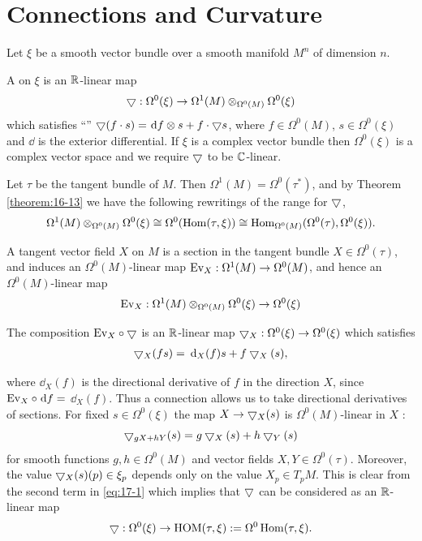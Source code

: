 \chapter{Connections and Curvature}
Let $\xi$ be a smooth vector bundle over a smooth manifold $M^n$ of dimension $n$.

\begin{definition}\label{definition:17-1}
A  on $\xi$ is an ${\mathbb{R}}$-linear map
\[
  \bigtriangledown:\Omega^0(\xi)\rightarrow \Omega^1(M)\otimes_{\Omega^0(M)} \Omega^0(\xi)
\]
which satisfies ``'' $\btd (f\cdot s)=\dd f\otimes  s + f\cdot \btd s$, 
where $f \in \Omega^0(M)$, $s\in \Omega^0(\xi)$ and $\dd$ is the exterior differential. 
If $\xi$ is a complex vector bundle then $\Omega^0(\xi)$ is a complex vector space and 
we require $\bigtriangledown$ to be ${\mathbb{C}}$-linear.
\end{definition}

Let $\tau$ be the tangent bundle of $M$. Then $\Omega^1(M)  = \Omega^0( {\tau }^{ * })$, 
and by Theorem \ref{theorem:16-13} we have the following rewritings of the range 
for $\bigtriangledown$,
\begin{align}\label{eq:17-1}
\Omega^1(M) \otimes_{\Omega^0(M) }\Omega^0(\xi)  
  \cong  \Omega^0( {\operatorname{Hom}( {\tau,\xi }) })  
  \cong  {\operatorname{Hom}}_{\Omega^0(M) }( {\Omega^0( \tau ),\Omega^0(\xi) }).
\end{align}

A tangent vector field $X$ on $M$ is a section in the tangent bundle $X \in  \Omega^0( \tau )$, 
and induces an $\Omega^0(M)$-linear map $\mathrm{Ev}_X:\Omega^1(M) \rightarrow \Omega^0(M)$, and hence 
an $\Omega^0(M)$-linear map
\[
\mathrm{Ev}_X:\Omega^1(M) \otimes_{\Omega^0(M) }\Omega^0(\xi)  \rightarrow  \Omega^0(\xi)
\]

The composition $\mathrm{Ev}_X\circ\bigtriangledown$ is an ${\mathbb{R}}$-linear map $\bigtriangledown_X:\Omega^0(\xi) 
\rightarrow\Omega^0(\xi)$ which satisfies
\begin{align}\label{eq:17-2}
\btd_X(fs)  = \dd_X(f) s + f\btd_X(s),
\end{align}

where $\dd_X(f)$ is the directional derivative of $f$ in the direction $X$, 
since $\R{Ev}_X \circ \dd f =$  $\dd_X(f)$. Thus a connection allows us to 
take directional derivatives of sections. For fixed $s\in\Omega^0(\xi)$ the 
map $X\rightarrow\bigtriangledown_X(s)$ is $\Omega^0(M)$-linear in $X$ :
\[
  \bigtriangledown_{{gX} + {hY}}(s)  = g\bigtriangledown_X(s)  + h\bigtriangledown_{Y}(s)
\]
for smooth functions $g,h \in  \Omega^0(M)$ and vector fields $X,Y \in \Omega^0( \tau )$. 
Moreover, the value $\bigtriangledown_X(s) (p)  \in  {\xi }_{p}$ depends only on the value $X_{p}\in {T}_{p}M$. 
This is clear from the second term in \eqref{eq:17-1} which implies that $\bigtriangledown$ can be considered as an ${\mathbb{R}}$-linear map
\[
  \bigtriangledown:\Omega^0(\xi) \rightarrow \mathrm{HOM}(\tau,\xi) \mathrel{:=} \Omega^0\operatorname{Hom}( {\tau,\xi }).
\]

